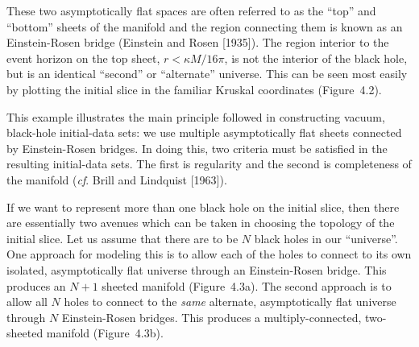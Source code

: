 
These two asymptotically flat spaces are often referred to as the ``top'' and
``bottom'' sheets of the manifold and the region connecting them is known as an
Einstein-Rosen bridge (Einstein and Rosen [1935]).  The region interior to the
event horizon on the top sheet, $r < \kappa M/16\pi$, is not the interior of the
black hole, but is an identical ``second'' or ``alternate'' universe.  This can
be seen most easily by plotting the initial slice in the familiar Kruskal
coordinates (Figure~4.2).


This example illustrates the main principle followed in constructing vacuum,
black-hole initial-data sets:  we use multiple asymptotically flat sheets
connected by Einstein-Rosen bridges.  In doing this, two criteria must be
satisfied in the resulting initial-data sets.  The first is regularity and the
second is completeness of the manifold ({\it cf}. Brill and Lindquist [1963]).

If we want to represent more than one black hole on the initial slice, then
there are essentially two avenues which can be taken in choosing the topology of
the initial slice.  Let us assume that there are to be $N$ black holes in our
``universe''.  One approach for modeling this is to allow each of the holes to
connect to its own isolated, asymptotically flat universe through an
Einstein-Rosen bridge.  This produces an $N + 1$ sheeted manifold (Figure~4.3a). 
The second approach is to allow all $N$ holes to connect to the {\it same}
alternate, asymptotically flat universe through $N$ Einstein-Rosen bridges.  This
produces a multiply-connected, two-sheeted manifold (Figure~4.3b).


